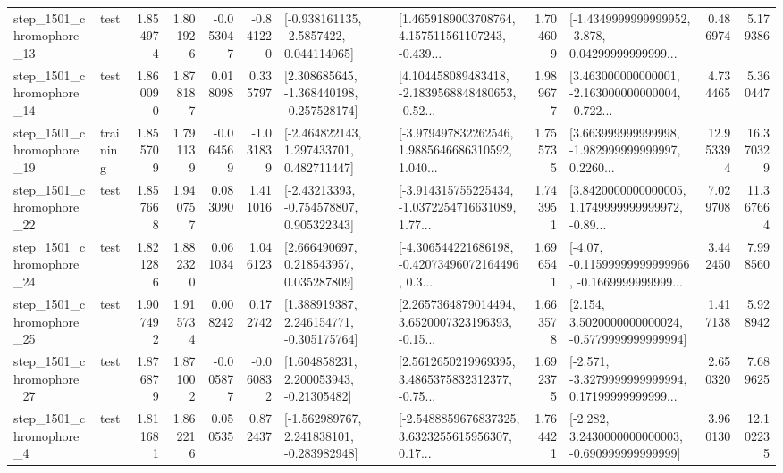 \begin{tabular}{llrrrrllrlrr}
 step\_1501\_chromophore\_13 &      test &      1.854974 &    1.801926 &     -0.053047 & -0.841220 &     [-0.938161135, -2.5857422, 0.044114065] &  [1.4659189003708764, 4.157511561107243, -0.439... &       1.704609 &  [-1.4349999999999952, -3.878, 0.04299999999999... &            0.486974 &          5.179386 \\
 step\_1501\_chromophore\_14 &      test &      1.860090 &    1.878187 &      0.018098 &  0.335797 &   [2.308685645, -1.368440198, -0.257528174] &  [4.104458089483418, -2.1839568848480653, -0.52... &       1.989677 &  [3.463000000000001, -2.163000000000004, -0.722... &            4.734465 &          5.360447 \\
 step\_1501\_chromophore\_19 &  training &      1.855709 &    1.791139 &     -0.064569 & -1.031839 &    [-2.464822143, 1.297433701, 0.482711447] &  [-3.979497832262546, 1.9885646686310592, 1.040... &       1.755735 &  [3.663999999999998, -1.982999999999997, 0.2260... &           12.953394 &         16.370329 \\
 step\_1501\_chromophore\_22 &      test &      1.857668 &    1.940757 &      0.083090 &  1.411016 &    [-2.43213393, -0.754578807, 0.905322343] &  [-3.914315755225434, -1.0372254716631089, 1.77... &       1.743951 &  [3.8420000000000005, 1.1749999999999972, -0.89... &            7.029708 &         11.367664 \\
 step\_1501\_chromophore\_24 &      test &      1.821286 &    1.882320 &      0.061034 &  1.046123 &     [2.666490697, 0.218543957, 0.035287809] &  [-4.306544221686198, -0.42073496072164496, 0.3... &       1.696541 &  [-4.07, -0.11599999999999966, -0.1669999999999... &            3.442450 &          7.998560 \\
 step\_1501\_chromophore\_25 &      test &      1.907492 &    1.915734 &      0.008242 &  0.172742 &    [1.388919387, 2.246154771, -0.305175764] &  [2.2657364879014494, 3.6520007323196393, -0.15... &       1.663578 &   [2.154, 3.5020000000000024, -0.5779999999999994] &            1.417138 &          5.928942 \\
 step\_1501\_chromophore\_27 &      test &      1.876879 &    1.871002 &     -0.005877 & -0.060832 &     [1.604858231, 2.200053943, -0.21305482] &  [2.5612650219969395, 3.4865375832312377, -0.75... &       1.692375 &  [-2.571, -3.3279999999999994, 0.17199999999999... &            2.650320 &          7.689625 \\
  step\_1501\_chromophore\_4 &      test &      1.811681 &    1.862216 &      0.050535 &  0.872437 &   [-1.562989767, 2.241838101, -0.283982948] &  [-2.5488859676837325, 3.6323255615956307, 0.17... &       1.764421 &   [-2.282, 3.2430000000000003, -0.690999999999999] &            3.960130 &         12.102235 \\

\end{tabular}

